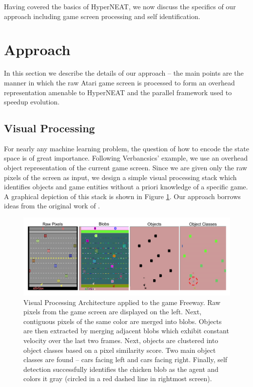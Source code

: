 \documentclass{acm_proc_article-sp}
\begin{document}
Having covered the basics of HyperNEAT, we now discuss the specifics of our approach including game screen processing and self identification.

\section{Approach}
\label{sec:approach}
In this section we describe the details of our approach -- the main points are the manner in which the raw Atari game screen is processed to form an overhead representation amenable to HyperNEAT and the parallel framework used to speedup evolution.

\subsection{Visual Processing}
For nearly any machine learning problem, the question of how to encode the state space is of great importance. Following Verbancsics' example, we use an overhead object representation of the current game screen. Since we are given only the raw pixels of the screen as input, we design a simple visual processing stack which identifies objects and game entities without a priori knowledge of a specific game. A graphical depiction of this stack is shown in Figure \ref{fig:visproc}. Our approach borrows ideas from the original work of \cite{naddaf10}. 

\begin{figure}[htp]
\begin{center}
\includegraphics[width=\textwidth]{figures/AtariArch}
\end{center}
\caption{Visual Processing Architecture applied to the game Freeway. Raw pixels from the game screen are displayed on the left. Next, contiguous pixels of the same color are merged into blobs. Objects are then extracted by merging adjacent blobs which exhibit constant velocity over the last two frames. Next, objects are clustered into object classes based on a pixel similarity score. Two main object classes are found -- cars facing left and cars facing right. Finally, self detection successfully identifies the chicken blob as the agent and colors it gray (circled in a red dashed line in rightmost screen).}
\label{fig:visproc}
\end{figure}
\end{document}
